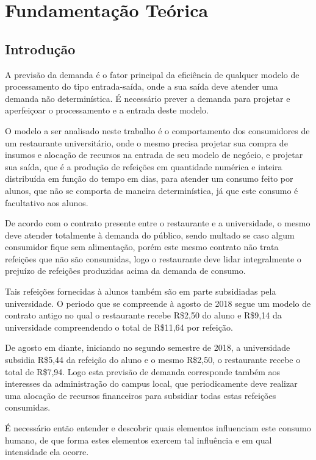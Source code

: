 \documentclass[	12pt, Times, openright, twoside, a4paper, english, brazil]{abntex2}
\begin{document}
  \chapter{Fundamentação Teórica}
      \section{Introdução}
        A previsão da demanda é o fator principal da eficiência de qualquer modelo de processamento do tipo entrada-saída, onde a sua saída deve atender uma demanda não determinística. É necessário prever a demanda para projetar e aperfeiçoar o processamento e a entrada deste modelo. 

        O modelo a ser analisado neste trabalho é o comportamento dos consumidores de um restaurante universitário, onde o mesmo precisa projetar sua compra de insumos e alocação de recursos na entrada de seu modelo de negócio, e projetar sua saída, que é a produção de refeições em quantidade numérica e inteira distribuída em função do tempo em dias, para atender um consumo feito por alunos, que não se comporta de maneira determinística, já que este consumo é facultativo aos alunos.

        De acordo com o contrato presente entre o restaurante e a universidade, o mesmo deve atender totalmente à demanda do público, sendo multado se caso algum consumidor fique sem alimentação, porém este mesmo contrato não trata refeições que não são consumidas, logo o restaurante deve lidar integralmente o prejuízo de refeições produzidas acima da demanda de consumo.

        Tais refeições fornecidas à alunos também são em parte subsidiadas pela universidade. O periodo que se compreende à agosto de 2018 segue um modelo de contrato antigo no qual o restaurante recebe R\$2,50 do aluno e R\$9,14 da universidade compreendendo o total de R\$11,64 por refeição.

        De agosto em diante, iniciando no segundo semestre de 2018, a universidade subsidia R\$5,44 da refeição do aluno e o mesmo R\$2,50, o restaurante recebe o total de R\$7,94. Logo esta previsão de demanda corresponde também aos interesses da administração do campus local, que periodicamente deve realizar uma alocação de recursos financeiros para subsidiar todas estas refeições consumidas.

        É necessário então entender e descobrir quais elementos influenciam este consumo humano, de que forma estes elementos exercem tal influência e em qual intensidade ela ocorre.
\end{document}
